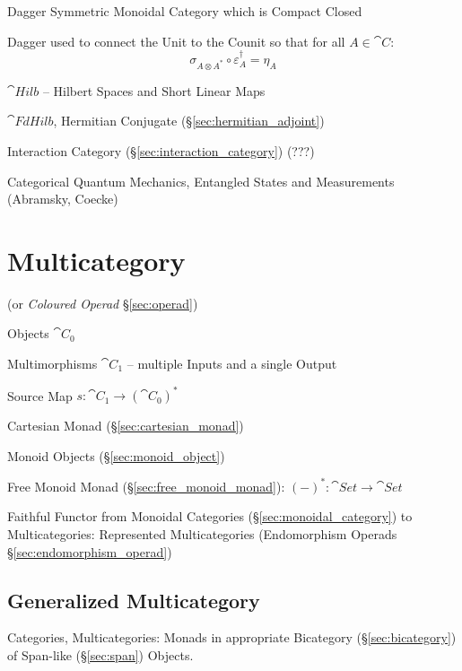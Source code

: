 Dagger Symmetric Monoidal Category which is Compact Closed

Dagger used to connect the Unit to the Counit so that for all $A \in
\cat{C}$:
\[
  \sigma_{A \otimes A^*} \circ \varepsilon_A^\dag = \eta_A
\]

$\cat{Hilb}$ -- Hilbert Spaces and Short Linear Maps

$\cat{FdHilb}$, Hermitian Conjugate (\S\ref{sec:hermitian_adjoint})

Interaction Category (\S\ref{sec:interaction_category}) (???)

Categorical Quantum Mechanics, Entangled States and Measurements
(Abramsky, Coecke)



\section{Multicategory}\label{sec:multicategory}

(or \emph{Coloured Operad} \S\ref{sec:operad})

Objects $\cat{C}_0$

Multimorphisms $\cat{C}_1$ -- multiple Inputs and a single Output

Source Map $s : \cat{C}_1 \rightarrow (\cat{C}_0)^*$

Cartesian Monad (\S\ref{sec:cartesian_monad})

Monoid Objects (\S\ref{sec:monoid_object})

Free Monoid Monad (\S\ref{sec:free_monoid_monad}): $(-)^* : \cat{Set}
\rightarrow \cat{Set}$

Faithful Functor from Monoidal Categories
(\S\ref{sec:monoidal_category}) to Multicategories: Represented
Multicategories (Endomorphism Operads \S\ref{sec:endomorphism_operad})



\subsection{Generalized Multicategory}
\label{sec:generalized_multicategory}

Categories, Multicategories: Monads in appropriate Bicategory
(\S\ref{sec:bicategory}) of Span-like (\S\ref{sec:span}) Objects.


